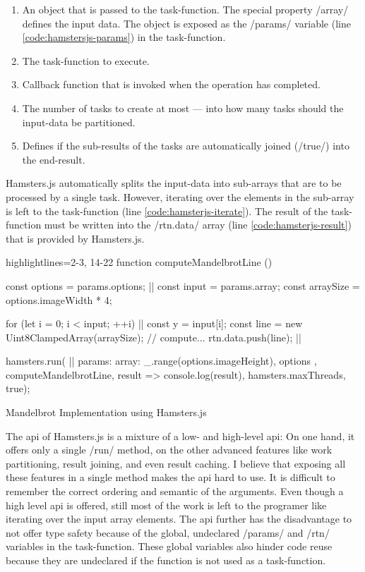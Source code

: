 \begin{enumerate}
	\item An object that is passed to the task-function. The special property \javascriptinline/array/ defines the input data. The object is exposed as the \javascriptinline/params/ variable (line \ref{code:hamstersjs-params}) in the task-function.
	\item The task-function to execute.
	\item Callback function that is invoked when the operation has completed.
	\item The number of tasks to create at most --- into how many tasks should the input-data be partitioned. 
	\item Defines if the sub-results of the tasks are automatically joined (\javascriptinline/true/) into the end-result.
\end{enumerate}

Hamsters.js automatically splits the input-data into sub-arrays that are to be processed by a single task. However, iterating over the elements in the sub-array is left to the task-function (line \ref{code:hamsterjs-iterate}). The result of the task-function must be written into the \javascriptinline/rtn.data/ array (line \ref{code:hamsterjs-result}) that is provided by Hamsters.js. 

\begin{listing}
\begin{javascriptcode*}{highlightlines={2-3, 14-22}}
function computeMandelbrotLine () {
	const options = params.options; |$\label{code:hamstersjs-params}$|
	const input = params.array;
	const arraySize = options.imageWidth * 4;

	for (let i = 0; i < input; ++i) {|$\label{code:hamsterjs-iterate}$|
		const y = input[i];
		const line = new Uint8ClampedArray(arraySize);
		// compute...
		rtn.data.push(line); |$\label{code:hamsterjs-result}$|
	}
}

hamsters.run( |$\label{code:hamsterjs-start}$|
	params: {
		array: _.range(options.imageHeight),
		options
	},  
	computeMandelbrotLine, 
	result => console.log(result), 
	hamsters.maxThreads, 
	true);
\end{javascriptcode*}
\caption{Mandelbrot Implementation using Hamsters.js}
\label{fig:mandelbrot-hamsterjs}
\end{listing}

The api of Hamsters.js is a mixture of a low- and high-level api: On one hand, it offers only a single \javascriptinline/run/ method, on the other advanced features like work partitioning, result joining, and even result caching. I believe that exposing all these features in a single method makes the api hard to use. It is difficult to remember the correct ordering and semantic of the arguments. Even though a high level api is offered, still most of the work is left to the programer like iterating over the input array elements. The api further has the disadvantage to not offer type safety because of the global, undeclared \javascriptinline/params/ and \javascriptinline/rtn/ variables in the task-function. These global variables also hinder code reuse because they are undeclared if the function is not used as a task-function. 

